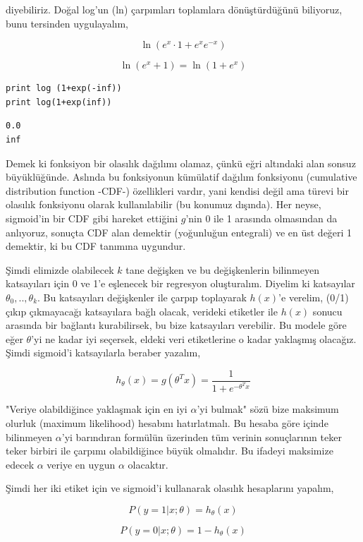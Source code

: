 \documentclass[12pt,fleqn]{article}\usepackage{../../common}
\begin{document}
diyebiliriz. Doğal log'un (ln) çarpımları toplamlara dönüştürdüğünü biliyoruz,
bunu tersinden uygulayalım,

$$ \ln (e^{x}\cdot 1 + e^{x}e^{-x})  $$

$$ \ln (e^{x} + 1)  = \ln (1 + e^{x} )  $$

\begin{verbatim}
print log (1+exp(-inf))
print log(1+exp(inf))
\end{verbatim}

\begin{verbatim}
0.0
inf
\end{verbatim}

Demek ki fonksiyon bir olasılık dağılımı olamaz, çünkü eğri altındaki alan
sonsuz büyüklüğünde. Aslında bu fonksiyonun kümülatif dağılım fonksiyonu
(cumulative distribution function -CDF-) özellikleri vardır, yani kendisi değil
ama türevi bir olasılık fonksiyonu olarak kullanılabilir (bu konumuz
dışında). Her neyse, sigmoid'in bir CDF gibi hareket ettiğini $g$'nin 0 ile 1
arasında olmasından da anlıyoruz, sonuçta CDF alan demektir (yoğunluğun
entegrali) ve en üst değeri 1 demektir, ki bu CDF tanımına uygundur.

Şimdi elimizde olabilecek $k$ tane değişken ve bu değişkenlerin bilinmeyen
katsayıları için 0 ve 1'e eşlenecek bir regresyon oluşturalım. Diyelim ki
katsayılar $\theta_0,..,\theta_k$. Bu katsayıları değişkenler ile çarpıp
toplayarak $h(x)$'e verelim, (0/1) çıkıp çıkmayacağı katsayılara bağlı
olacak, verideki etiketler ile $h(x)$ sonucu arasında bir bağlantı
kurabilirsek, bu bize katsayıları verebilir. Bu modele göre eğer
$\theta$'yi ne kadar iyi seçersek, eldeki veri etiketlerine o kadar
yaklaşmış olacağız. Şimdi sigmoid'i katsayılarla beraber yazalım,

$$ h_\theta(x) = g(\theta^T x) = \frac{1}{1+e^{-\theta^T x}} $$

"Veriye olabildiğince yaklaşmak için en iyi $\alpha$'yi bulmak" sözü bize
maksimum olurluk (maximum likelihood) hesabını hatırlatmalı. Bu hesaba göre
içinde bilinmeyen $\alpha$'yi barındıran formülün üzerinden tüm verinin
sonuçlarının teker teker birbiri ile çarpımı olabildiğince büyük olmalıdır. Bu
ifadeyi maksimize edecek $\alpha$ veriye en uygun $\alpha$ olacaktır.

Şimdi her iki etiket için ve sigmoid'i kullanarak olasılık hesaplarını
yapalım,

$$ P(y=1 | x;\theta) = h_\theta(x) $$

$$ P(y=0 | x;\theta) = 1 - h_\theta(x) $$
\end{document}
